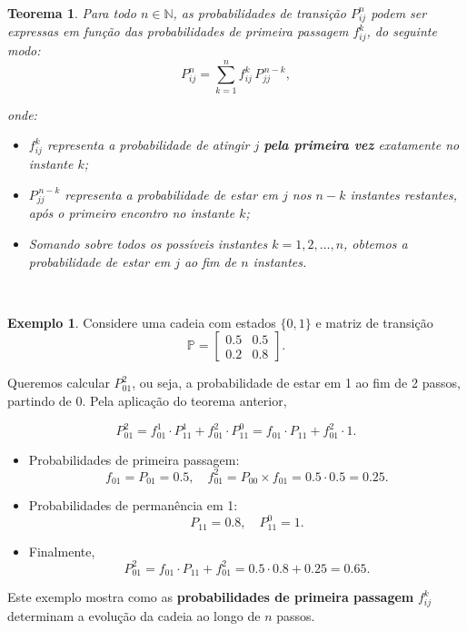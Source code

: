 \documentclass[
  11pt,
  a4paper,
]{book}
\newtheorem{theorem}{Teorema}[chapter]
\theoremstyle{definition}
\theoremstyle{definition}
\newtheorem{example}{Exemplo}[chapter]
\theoremstyle{definition}
\theoremstyle{definition}
\theoremstyle{remark}
\begin{document}
\(\,\)

\begin{theorem}

Para todo \(n \in \mathbb{N}\), as probabilidades de transição \(P_{ij}^n\) podem ser expressas em função das probabilidades de primeira passagem \(f_{ij}^k\), do seguinte modo:
\[
P_{ij}^n = \sum_{k=1}^n f_{ij}^k \, P_{jj}^{\,n-k},
\]

onde:

\begin{itemize}
\item
  \(f_{ij}^k\) representa a probabilidade de atingir \(j\) \textbf{pela primeira vez} exatamente no instante \(k\);
\item
  \(P_{jj}^{\,n-k}\) representa a probabilidade de estar em \(j\) nos \(n-k\) instantes restantes, após o primeiro encontro no instante \(k\);
\item
  Somando sobre todos os possíveis instantes \(k = 1,2,\dots,n\), obtemos a probabilidade de estar em \(j\) ao fim de \(n\) instantes.
\end{itemize}

\end{theorem}

\(\,\)

\begin{example}
Considere uma cadeia com estados \(\{0,1\}\) e matriz de transição
\[
\mathbb{P} =
\begin{bmatrix}
0.5 & 0.5 \\
0.2 & 0.8
\end{bmatrix}.
\]

Queremos calcular \(P_{01}^2\), ou seja, a probabilidade de estar em 1 ao fim de 2 passos, partindo de 0. Pela aplicação do teorema anterior,

\[P_{01}^2 = f_{01}^1 \cdot P_{11}^1 + f_{01}^2 \cdot P_{11}^0=f_{01} \cdot P_{11} + f_{01}^2 \cdot 1.\]

\begin{itemize}
\item
  Probabilidades de primeira passagem:
  \[
  f_{01} = P_{01}=0.5, \quad f_{01}^2 = P_{00} \times f_{01} =0.5 \cdot 0.5 = 0.25.
  \]
\item
  Probabilidades de permanência em 1:
  \[
  P_{11} = 0.8, \quad P_{11}^0 = 1.
  \]
\item
  Finalmente,
  \[
  P_{01}^2 = f_{01} \cdot P_{11} + f_{01}^2 = 0.5 \cdot 0.8 + 0.25  = 0.65.
  \]
\end{itemize}

Este exemplo mostra como as \textbf{probabilidades de primeira passagem} \(f_{ij}^k\) determinam a evolução da cadeia ao longo de \(n\) passos.
\end{example}
\end{document}
